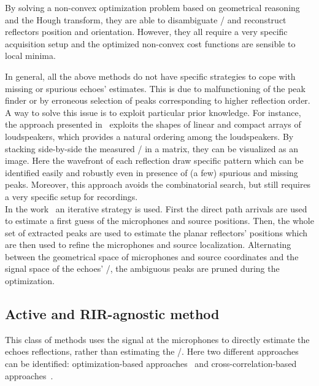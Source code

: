 By solving a non-convex optimization problem based on geometrical reasoning and the Hough transform, they are able to disambiguate \TOAs/ and reconstruct reflectors position and orientation.
However, they all require a very specific acquisition setup and the optimized non-convex cost functions are sensible to local minima.

\mynewline
In general, all the above methods do not have specific strategies to cope with missing or spurious echoes' estimates.
This is due to malfunctioning of the peak finder or by erroneous selection of peaks corresponding to higher reflection order.
A way to solve this issue is to exploit particular prior knowledge.
For instance, the approach presented in~ exploits the shapes of linear and compact arrays of loudspeakers, which provides a natural ordering among the loudspeakers.
By stacking side-by-side the measured \RIRs/ in a matrix, they can be visualized as an image.
Here the wavefront of each reflection draw specific pattern which can be identified easily and robustly even in presence of (a few) spurious and missing peaks.
Moreover, this approach avoids the combinatorial search, but still requires a very specific setup for recordings.
\\In the work~ an iterative strategy is used.
First the direct path arrivals are used to estimate a first guess of the microphones and source positions.
Then, the whole set of extracted peaks are used to estimate the planar reflectors' positions which are then used to refine the microphones and source localization.
Alternating between the geometrical space of microphones and source coordinates and the signal space of the echoes' \TOAs/, the ambiguous peaks are pruned during the optimization.

\subsection{Active and RIR-agnostic method}\label{subsec:estimation:active_agnostic}
This class of methods uses the signal at the microphones to directly estimate the echoes reflections, rather than estimating the \RIRs/.
Here two different approaches can be identified: optimization-based approaches~ and cross-correlation-based approaches~.

